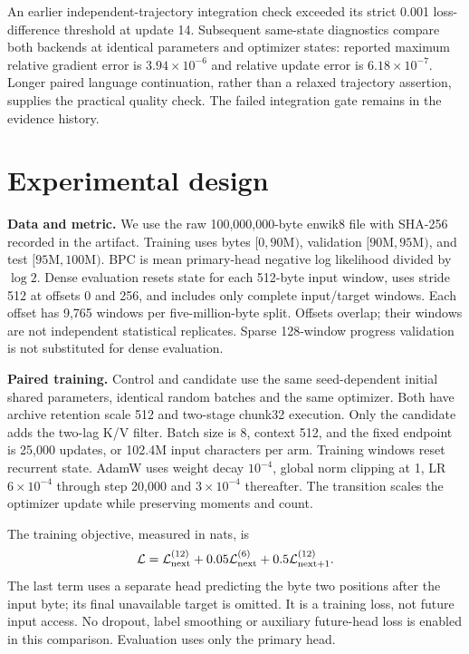 \documentclass[10pt]{article}
\begin{document}
An earlier independent-trajectory integration check exceeded its strict
0.001 loss-difference threshold at update 14. Subsequent same-state diagnostics
compare both backends at identical parameters and optimizer states: reported
maximum relative gradient error is $3.94\times10^{-6}$ and relative update error
is $6.18\times10^{-7}$. Longer paired language continuation, rather than a
relaxed trajectory assertion, supplies the practical quality check. The failed
integration gate remains in the evidence history.

\section{Experimental design}
\label{sec:protocol}
\textbf{Data and metric.} We use the raw 100,000,000-byte enwik8 file with SHA-256
recorded in the artifact. Training uses bytes $[0,90\mathrm{M})$, validation
$[90\mathrm{M},95\mathrm{M})$, and test $[95\mathrm{M},100\mathrm{M})$.
BPC is mean primary-head negative log likelihood divided by $\log 2$.
Dense evaluation resets state for each 512-byte input window, uses stride 512
at offsets 0 and 256, and includes only complete input/target windows. Each
offset has 9,765 windows per five-million-byte split. Offsets overlap; their
windows are not independent statistical replicates. Sparse 128-window progress
validation is not substituted for dense evaluation.

\textbf{Paired training.} Control and candidate use the same seed-dependent
initial shared parameters, identical random batches and the same optimizer.
Both have archive retention scale 512 and two-stage chunk32 execution. Only the
candidate adds the two-lag K/V filter. Batch size is 8, context 512, and the fixed
endpoint is 25,000 updates, or 102.4M input characters per arm. Training windows
reset recurrent state. AdamW uses weight decay $10^{-4}$, global norm clipping
at 1, LR $6\times10^{-4}$ through step 20,000 and $3\times10^{-4}$ thereafter.
The transition scales the optimizer update while preserving moments and count.

The training objective, measured in nats, is
\begin{equation}
 \mathcal L=\mathcal L_{\rm next}^{(12)}
          +0.05\mathcal L_{\rm next}^{(6)}
          +0.5\mathcal L_{\rm next+1}^{(12)}.
\end{equation}
The last term uses a separate head predicting the byte two positions after the
input byte; its final unavailable target is omitted. It is a training loss, not
future input access. No dropout, label smoothing or auxiliary future-head loss
is enabled in this comparison. Evaluation uses only the primary head.
\end{document}
